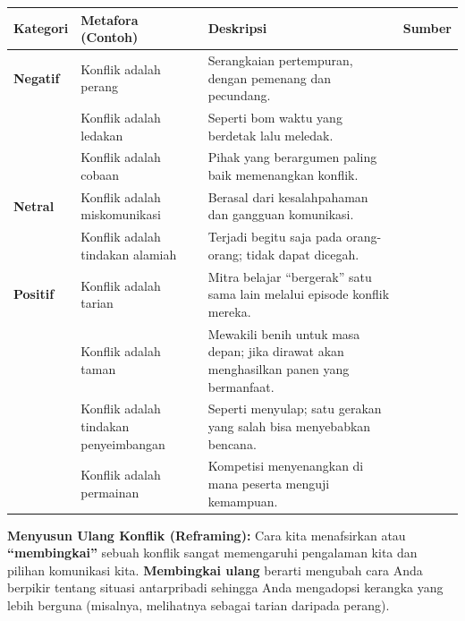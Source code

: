 \documentclass[
  letterpaper,
  DIV=11,
  numbers=noendperiod]{scrreprt}
\begin{document}
\begin{longtable}[]{@{}
  >{\raggedright\arraybackslash}p{}
  >{\raggedright\arraybackslash}p{}
  >{\raggedright\arraybackslash}p{}
  >{\raggedright\arraybackslash}p{}@{}}
\toprule\noalign{}
\begin{minipage}[b]{\linewidth}\raggedright
Kategori
\end{minipage} & \begin{minipage}[b]{\linewidth}\raggedright
Metafora (Contoh)
\end{minipage} & \begin{minipage}[b]{\linewidth}\raggedright
Deskripsi
\end{minipage} & \begin{minipage}[b]{\linewidth}\raggedright
Sumber
\end{minipage} \\
\midrule\noalign{}
\endhead
\bottomrule\noalign{}
\endlastfoot
\textbf{Negatif} & Konflik adalah perang & Serangkaian pertempuran,
dengan pemenang dan pecundang. & \\
& Konflik adalah ledakan & Seperti bom waktu yang berdetak lalu meledak.
& \\
& Konflik adalah cobaan & Pihak yang berargumen paling baik memenangkan
konflik. & \\
\textbf{Netral} & Konflik adalah miskomunikasi & Berasal dari
kesalahpahaman dan gangguan komunikasi. & \\
& Konflik adalah tindakan alamiah & Terjadi begitu saja pada
orang-orang; tidak dapat dicegah. & \\
\textbf{Positif} & Konflik adalah tarian & Mitra belajar ``bergerak''
satu sama lain melalui episode konflik mereka. & \\
& Konflik adalah taman & Mewakili benih untuk masa depan; jika dirawat
akan menghasilkan panen yang bermanfaat. & \\
& Konflik adalah tindakan penyeimbangan & Seperti menyulap; satu gerakan
yang salah bisa menyebabkan bencana. & \\
& Konflik adalah permainan & Kompetisi menyenangkan di mana peserta
menguji kemampuan. & \\
\end{longtable}

\textbf{Menyusun Ulang Konflik (Reframing):} Cara kita menafsirkan atau
\textbf{``membingkai''} sebuah konflik sangat memengaruhi pengalaman
kita dan pilihan komunikasi kita. \textbf{Membingkai ulang} berarti
mengubah cara Anda berpikir tentang situasi antarpribadi sehingga Anda
mengadopsi kerangka yang lebih berguna (misalnya, melihatnya sebagai
tarian daripada perang).
\end{document}
